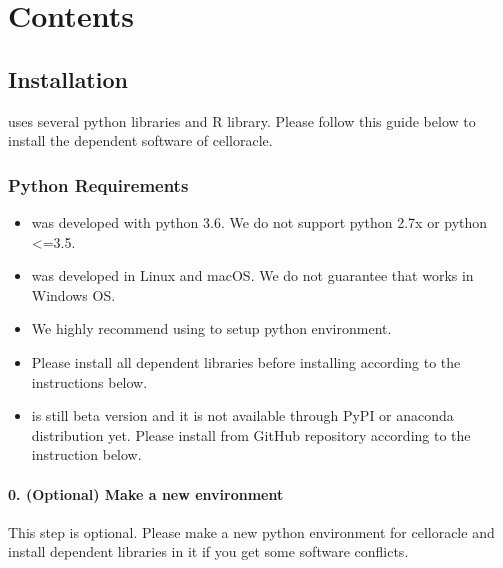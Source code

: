 \documentclass[letterpaper,10pt,english]{sphinxmanual}
\begin{document}
\chapter{Contents}
\label{\detokenize{index:contents}}

\section{Installation}
\label{\detokenize{installation/index:installation}}\label{\detokenize{installation/index:install}}\label{\detokenize{installation/index::doc}}
 uses several python libraries and R library. Please follow this guide below to install the dependent software of celloracle.


\subsection{Python Requirements}
\label{\detokenize{installation/index:python-requirements}}\label{\detokenize{installation/index:require}}\begin{itemize}
\item {} 
 was developed with python 3.6. We do not support python 2.7x or python \textless{}=3.5.

\item {} 
 was developed in Linux and macOS. We do not guarantee that  works in Windows OS.

\item {} 
We highly recommend using  to setup python environment.

\item {} 
Please install all dependent libraries before installing  according to the instructions below.

\item {} 
  is still beta version and it is not available through PyPI or anaconda distribution yet. Please install  from GitHub repository according to the instruction below.

\end{itemize}


\subsubsection{0. (Optional) Make a new environment}
\label{\detokenize{installation/index:optional-make-a-new-environment}}
This step is optional. Please make a new python environment for celloracle and install dependent libraries in it if you get some software conflicts.
\end{document}
